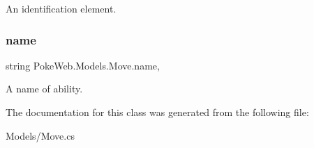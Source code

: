 An identification element. \mbox{\label{class_poke_web_1_1_models_1_1_move_a78bbe5e25915a5edc31479c696e80274}} 
\subsubsection{\texorpdfstring{name}{name}}
{\footnotesize\ttfamily string Poke\+Web.\+Models.\+Move.\+name\hspace{0.3cm}{\ttfamily [get]}, {\ttfamily [set]}}

A name of ability. 

The documentation for this class was generated from the following file\+:\begin{DoxyCompactItemize}
\item 
Models/Move.\+cs\end{DoxyCompactItemize}

